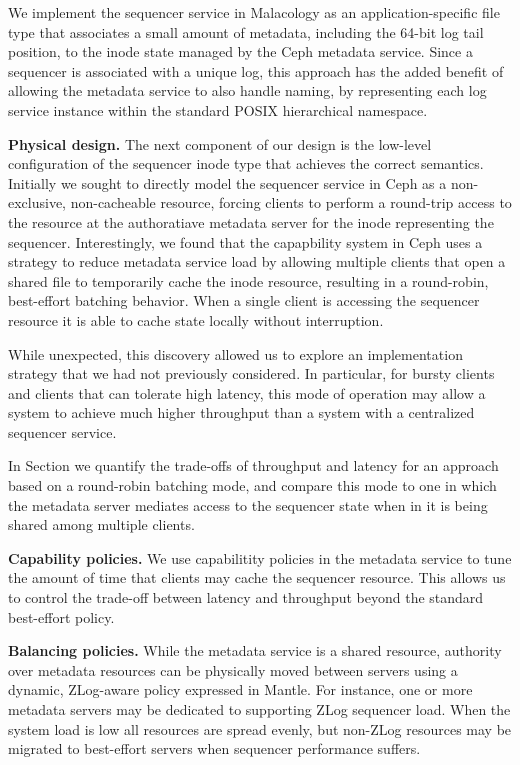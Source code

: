 \documentclass[10pt,twocolumn]{article}
\begin{document}
We implement the sequencer service in Malacology as an application-specific
file type that associates a small amount of metadata, including the 64-bit log
tail position, to the inode state managed by the Ceph metadata service.  Since
a sequencer is associated with a unique log, this approach has the added
benefit of allowing the metadata service to also handle naming, by
representing each log service instance within the standard POSIX hierarchical
namespace.

{\bf Physical design.}
The next component of our design is the low-level configuration of the
sequencer inode type that achieves the correct semantics.  Initially we sought
to directly model the sequencer service in Ceph as a non-exclusive,
non-cacheable resource, forcing clients to perform a round-trip access to the
resource at the authoratiave metadata server for the inode representing the
sequencer.  Interestingly, we found that the capapbility system in Ceph uses a
strategy to reduce metadata service load by allowing multiple clients that
open a shared file to temporarily cache the inode resource, resulting in a
round-robin, best-effort batching behavior. When a single client is accessing
the sequencer resource it is able to cache state locally without interruption.

While unexpected, this discovery allowed us to explore an implementation
strategy that we had not previously considered. In particular, for bursty
clients and clients that can tolerate high latency, this mode of operation may
allow a system to achieve much higher throughput than a system with a
centralized sequencer service.

In Section we quantify the trade-offs of throughput and latency for an
approach based on a round-robin batching mode, and compare this mode to one in
which the metadata server mediates access to the sequencer state when in it is
being shared among multiple clients.

{\bf Capability policies.}
We use capabilitity policies in the metadata service to tune the amount of
time that clients may cache the sequencer resource. This allows us to control
the trade-off between latency and throughput beyond the standard best-effort
policy.

{\bf Balancing policies.}
While the metadata service is a shared resource, authority over metadata
resources can be physically moved between servers using a dynamic, ZLog-aware
policy expressed in Mantle. For instance, one or more metadata servers may be
dedicated to supporting ZLog sequencer load. When the system load is low all
resources are spread evenly, but non-ZLog resources may be migrated to
best-effort servers when sequencer performance suffers.
\end{document}
